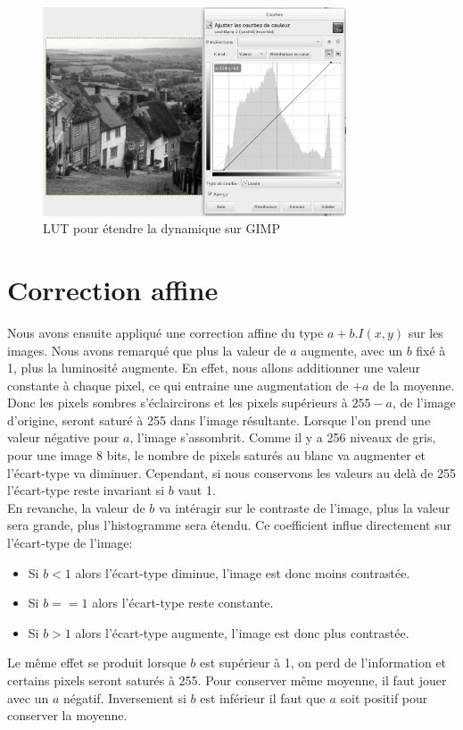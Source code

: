 \documentclass[a4paper,11pt]{article}
\begin{document}
  \begin{figure}[H]
    \center
    \includegraphics[width=9cm]{LUT-Q1.png}
    \caption{LUT pour étendre la dynamique sur GIMP}
  \end{figure}
  
  \section{Correction affine}
  Nous avons ensuite appliqué une correction affine du type $a+b.I(x,y)$ sur les images.
  Nous avons remarqué que plus la valeur de $a$ augmente, avec un $b$ fixé à 1, plus la 
  luminosité augmente. En effet, nous allons additionner une valeur constante à chaque 
  pixel, ce qui entraine une augmentation de $+a$ de la moyenne. Donc les pixels sombres
  s'éclaircirons et les pixels supérieurs à $255-a$, de l'image d'origine, seront saturé à 255 dans l'image résultante.
  Lorsque l'on prend une valeur négative pour $a$, l'image s'assombrit. Comme il y a 256 
  niveaux de gris, pour une image 8 bits, le nombre de pixels saturés au blanc va augmenter
  et l'écart-type va diminuer. Cependant, si nous conservons les valeurs au delà de 255 
  l'écart-type reste invariant si $b$ vaut 1.\\
  
  En revanche, la valeur de $b$ va intéragir sur le contraste de l'image, plus la valeur 
  sera grande, plus l'histogramme sera étendu. Ce coefficient influe directement sur 
  l'écart-type de l'image:
  \begin{itemize}
   \item Si $b<1$ alors l'écart-type diminue, l'image est donc moins contrastée.
   \item Si $b==1$ alors l'écart-type reste constante.
   \item Si $b>1$ alors l'écart-type augmente, l'image est donc plus contrastée.
  \end{itemize}
  Le même effet se produit lorsque $b$ est supérieur à 1, on perd de l'information et 
  certains pixels seront saturés à 255. Pour conserver même moyenne, il faut jouer avec 
  un $a$ négatif. Inversement si $b$ est inférieur il faut que $a$ soit positif pour 
  conserver la moyenne.\\
  
\end{document}
